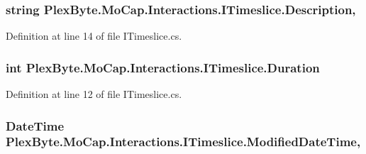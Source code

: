 \subsubsection[{\texorpdfstring{Description}{Description}}]{\setlength{\rightskip}{0pt plus 5cm}string Plex\+Byte.\+Mo\+Cap.\+Interactions.\+I\+Timeslice.\+Description\hspace{0.3cm}{\ttfamily [get]}, {\ttfamily [set]}}\hypertarget{interface_plex_byte_1_1_mo_cap_1_1_interactions_1_1_i_timeslice_ad37b8578c03d8e90956a670b9a70bcbd}{}\label{interface_plex_byte_1_1_mo_cap_1_1_interactions_1_1_i_timeslice_ad37b8578c03d8e90956a670b9a70bcbd}


Definition at line 14 of file I\+Timeslice.\+cs.

\subsubsection[{\texorpdfstring{Duration}{Duration}}]{\setlength{\rightskip}{0pt plus 5cm}int Plex\+Byte.\+Mo\+Cap.\+Interactions.\+I\+Timeslice.\+Duration\hspace{0.3cm}{\ttfamily [get]}}\hypertarget{interface_plex_byte_1_1_mo_cap_1_1_interactions_1_1_i_timeslice_ae5913fb8d9d7a5b4de9b9b9a4acd94be}{}\label{interface_plex_byte_1_1_mo_cap_1_1_interactions_1_1_i_timeslice_ae5913fb8d9d7a5b4de9b9b9a4acd94be}


Definition at line 12 of file I\+Timeslice.\+cs.

\subsubsection[{\texorpdfstring{Modified\+Date\+Time}{ModifiedDateTime}}]{\setlength{\rightskip}{0pt plus 5cm}Date\+Time Plex\+Byte.\+Mo\+Cap.\+Interactions.\+I\+Timeslice.\+Modified\+Date\+Time\hspace{0.3cm}{\ttfamily [get]}, {\ttfamily [set]}}\hypertarget{interface_plex_byte_1_1_mo_cap_1_1_interactions_1_1_i_timeslice_adebf67921d263827545fa2f8f97d3b50}{}\label{interface_plex_byte_1_1_mo_cap_1_1_interactions_1_1_i_timeslice_adebf67921d263827545fa2f8f97d3b50}


